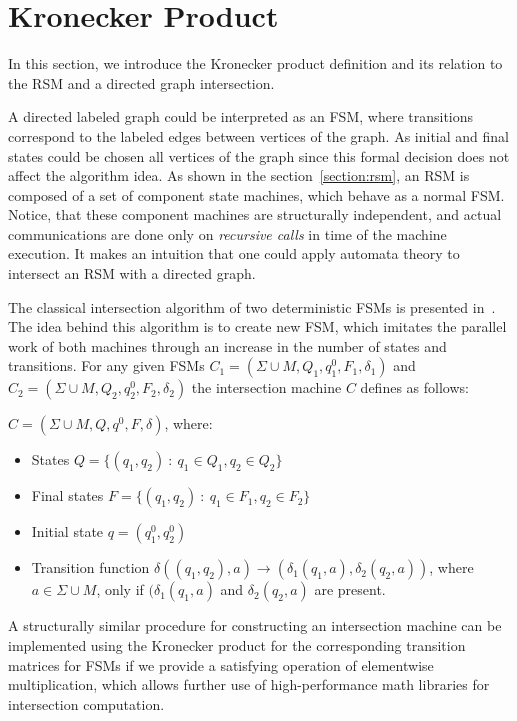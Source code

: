 \section{Kronecker Product}
\label{kronecker:section}

In this section, we introduce the Kronecker product definition and its relation to the RSM and a directed graph intersection.

A directed labeled graph could be interpreted as an FSM, where transitions correspond to the labeled edges between vertices of the graph. 
As initial and final states could be chosen all vertices of the graph since this formal decision does not affect the algorithm idea.
As shown in the section~\ref{section:rsm}, an RSM is composed of a set of component state machines, which behave as a normal FSM. 
Notice, that these component machines are structurally independent, and actual communications are done only on \textit{recursive calls} in time of the machine execution. 
It makes an intuition that one could apply automata theory to intersect an RSM with a directed graph.

The classical intersection algorithm of two deterministic FSMs is presented in~\cite{automata:theory:10.5555/1177300}. 
The idea behind this algorithm is to create new FSM, which imitates the parallel work of both machines through an increase in the number of states and transitions. 
For any given FSMs $C_1 = (\Sigma \cup M,Q_1,q_1^0,F_1,\delta_1)$ and $C_2 = (\Sigma \cup M,Q_2,q_2^0,F_2,\delta_2)$ the intersection machine $C$ defines as follows: 

$C = (\Sigma \cup M, Q, q^0, F, \delta)$, where:

\begin{itemize}
    \item States $Q = \{(q_1,q_2)~:~q_1 \in Q_1, q_2 \in Q_2 \}$
    \item Final states $F = \{(q_1,q_2)~:~q_1 \in F_1, q_2 \in F_2 \}$
    \item Initial state $q = (q_1^0,q_2^0)$
    \item Transition function $\delta ((q_1,q_2),a) \to (\delta_1(q_1,a),\delta_2(q_2,a))$, where $a \in \Sigma \cup M$, only if $(\delta_1(q_1,a)$ and $\delta_2(q_2,a)$ are present.
\end{itemize}

A structurally similar procedure for constructing an intersection machine can be implemented using the Kronecker product for the corresponding transition matrices for FSMs if we provide a satisfying operation of elementwise multiplication, which allows further use of high-performance math libraries for intersection computation.

